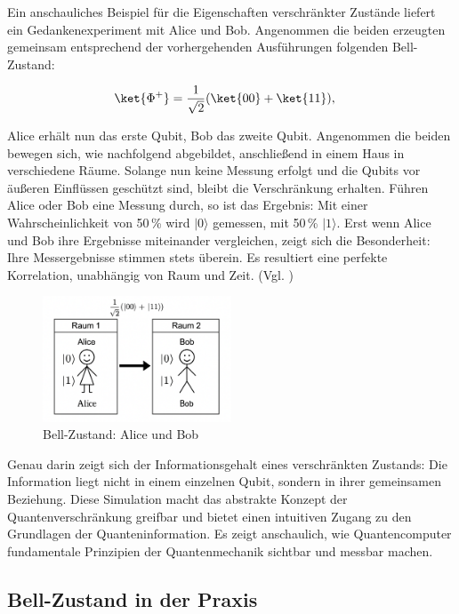 Ein anschauliches Beispiel für die Eigenschaften verschränkter Zustände liefert ein Gedankenexperiment mit Alice und Bob. Angenommen die beiden erzeugten gemeinsam entsprechend der vorhergehenden Ausführungen folgenden Bell-Zustand:

\[
\begin{aligned}
\ket{\Phi^+} &= \frac{1}{\sqrt{2}} (\ket{00} + \ket{11}),
\end{aligned}
\]

Alice erhält nun das erste Qubit, Bob das zweite Qubit. Angenommen die beiden bewegen sich, wie nachfolgend abgebildet, anschließend in einem Haus in verschiedene Räume. Solange nun keine Messung erfolgt und die Qubits vor äußeren Einflüssen geschützt sind, bleibt die Verschränkung erhalten. Führen Alice oder Bob eine Messung durch, so ist das Ergebnis: Mit einer Wahrscheinlichkeit von 50\,\% wird $|0\rangle$ gemessen, mit 50\,\% $|1\rangle$. Erst wenn Alice und Bob ihre Ergebnisse miteinander vergleichen, zeigt sich die Besonderheit: Ihre Messergebnisse stimmen stets überein. Es resultiert eine perfekte Korrelation, unabhängig von Raum und Zeit. (Vgl. \cite[S.54]{homeister_quantum_2022})


\begin{figure}[h]
  \centering
  \includegraphics[width=0.5\textwidth]{images/quantum-information/Bell_Alice_Bob.png}
  \caption{Bell-Zustand: Alice und Bob}
\end{figure}



Genau darin zeigt sich der Informationsgehalt eines verschränkten Zustands: Die Information liegt nicht in einem einzelnen Qubit, sondern in ihrer gemeinsamen Beziehung. Diese Simulation macht das abstrakte Konzept der Quantenverschränkung greifbar und bietet einen intuitiven Zugang zu den Grundlagen der Quanteninformation. Es zeigt anschaulich, wie Quantencomputer fundamentale Prinzipien der Quantenmechanik sichtbar und messbar machen. 

\subsection{Bell-Zustand in der Praxis}

